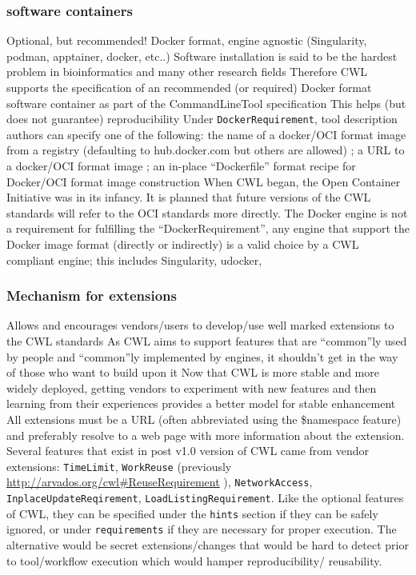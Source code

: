 \subsubsection{software containers}
Optional, but recommended! Docker format, engine agnostic (Singularity, podman, apptainer, docker, etc..)
Software installation is said to be the hardest problem in bioinformatics and many other research fields
Therefore CWL supports the specification of an recommended (or required) Docker format software container as part of the CommandLineTool specification
This helps (but does not guarantee) reproducibility
Under \verb|DockerRequirement|, tool description authors can specify one of the following: the name of a docker/OCI format image from a registry (defaulting to hub.docker.com but others are allowed) ; a URL to a docker/OCI format image ; an in-place “Dockerfile” format recipe for Docker/OCI format image construction
When CWL began, the Open Container Initiative was in its infancy. It is planned that future versions of the CWL standards will refer to the OCI standards more directly. The Docker engine is not a requirement for fulfilling the “DockerRequirement”, any engine that support the Docker image format (directly or indirectly) is a valid choice by a CWL compliant engine; this includes Singularity, udocker,
\subsubsection{Mechanism for extensions}
Allows and encourages vendors/users to develop/use well marked extensions to the CWL standards
As CWL aims to support features that are “common”ly used by people and “common”ly implemented by engines, it shouldn’t get in the way of those who want to build upon it
Now that CWL is more stable and more widely deployed, getting vendors to experiment with new features and then learning from their experiences provides a better model for stable enhancement
All extensions must be a URL (often abbreviated using the \$namespace feature) and preferably resolve to a web page with more information about the extension. Several features that exist in post v1.0 version of CWL came from vendor extensions: \verb|TimeLimit|, \verb|WorkReuse| (previously \url{http://arvados.org/cwl#ReuseRequirement} ), \verb|NetworkAccess|, \verb|InplaceUpdateReqirement|, \verb|LoadListingRequirement|. Like the optional features of CWL, they can be specified under the \verb|hints| section if they can be safely ignored, or under \verb|requirements| if they are necessary for proper execution.
The alternative would be secret extensions/changes that would be hard to detect prior to tool/workflow execution which would hamper reproducibility/ reusability.
